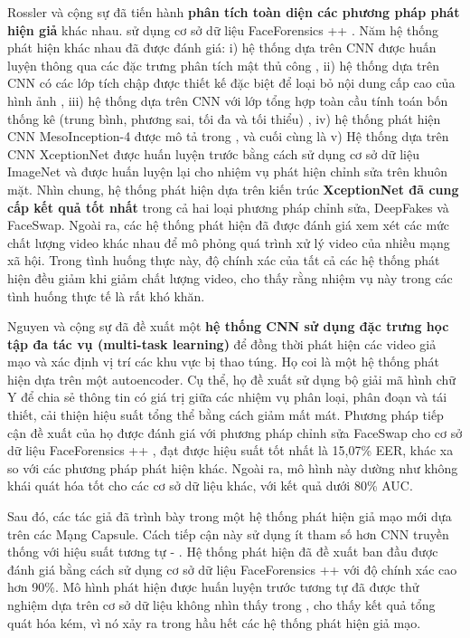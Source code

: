 \documentclass{article}
\begin{document}
Rossler và cộng sự đã tiến hành \textbf{phân tích toàn diện các phương pháp phát hiện giả} khác nhau. sử dụng cơ sở dữ liệu FaceForensics ++ . Năm hệ thống phát hiện khác nhau đã được đánh giá: i) hệ thống dựa trên CNN được huấn luyện thông qua các đặc trưng phân tích mật thủ công , ii) hệ thống dựa trên CNN có các lớp tích chập được thiết kế đặc biệt để loại bỏ nội dung cấp cao của hình ảnh , iii) hệ thống dựa trên CNN với lớp tổng hợp toàn cầu tính toán bốn thống kê (trung bình, phương sai, tối đa và tối thiểu) , iv) hệ thống phát hiện CNN MesoInception-4 được mô tả trong , và cuối cùng là v) Hệ thống dựa trên CNN XceptionNet  được huấn luyện trước bằng cách sử dụng cơ sở dữ liệu ImageNet  và được huấn luyện lại cho nhiệm vụ phát hiện chỉnh sửa trên khuôn mặt. Nhìn chung, hệ thống phát hiện dựa trên kiến trúc\textbf{ XceptionNet đã cung cấp kết quả tốt nhất} trong cả hai loại phương pháp chỉnh sửa, DeepFakes và FaceSwap. Ngoài ra, các hệ thống phát hiện đã được đánh giá xem xét các mức chất lượng video khác nhau để mô phỏng quá trình xử lý video của nhiều mạng xã hội. Trong tình huống thực này, độ chính xác của tất cả các hệ thống phát hiện đều giảm khi giảm chất lượng video, cho thấy rằng nhiệm vụ này trong các tình huống thực tế là rất khó khăn.

Nguyen và cộng sự  đã đề xuất một \textbf{hệ thống CNN sử dụng đặc trưng học tập đa tác vụ (multi-task learning)} để đồng thời phát hiện các video giả mạo và xác định vị trí các khu vực bị thao túng. Họ coi là một hệ thống phát hiện dựa trên một autoencoder. Cụ thể, họ đề xuất sử dụng bộ giải mã hình chữ Y để chia sẻ thông tin có giá trị giữa các nhiệm vụ phân loại, phân đoạn và tái thiết, cải thiện hiệu suất tổng thể bằng cách giảm mất mát. Phương pháp tiếp cận đề xuất của họ được đánh giá với phương pháp chỉnh sửa FaceSwap cho cơ sở dữ liệu FaceForensics ++ , đạt được hiệu suất tốt nhất là 15,07\% EER, khác xa so với các phương pháp phát hiện khác. Ngoài ra, mô hình này dường như không khái quát hóa tốt cho các cơ sở dữ liệu khác, với kết quả dưới 80\% AUC.

Sau đó, các tác giả đã trình bày trong  một hệ thống phát hiện giả mạo mới dựa trên các Mạng Capsule. Cách tiếp cận này sử dụng ít tham số hơn CNN truyền thống với hiệu suất tương tự  - . Hệ thống phát hiện đã đề xuất ban đầu được đánh giá bằng cách sử dụng cơ sở dữ liệu FaceForensics ++ với độ chính xác cao hơn 90\%. Mô hình phát hiện được huấn luyện trước tương tự đã được thử nghiệm dựa trên cơ sở dữ liệu không nhìn thấy trong , cho thấy kết quả tổng quát hóa kém, vì nó xảy ra trong hầu hết các hệ thống phát hiện giả mạo.
\end{document}

